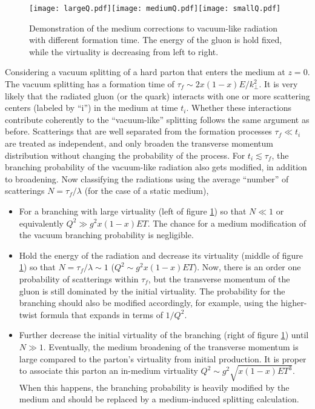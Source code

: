 \begin{figure}
\singlespacing
\texttt{[image: largeQ.pdf]}\texttt{[image: mediumQ.pdf]}\texttt{[image: smallQ.pdf]}
\caption[Demonstration of the medium corrections to vacuum-like radiation]{Demonstration of the medium corrections to vacuum-like radiation with different formation time. The energy of the gluon is hold fixed, while the virtuality is decreasing from left to right.}
\label{fig:vac-med-interface}
\end{figure}

Considering a vacuum splitting of a hard parton that enters the medium at $z=0$.
The vacuum splitting has a formation time of $\tau_f \sim 2x(1-x)E/k_\perp^2$.
It is very likely that the radiated gluon (or the quark) interacts with one or more scattering centers (labeled by ``i'') in the medium at time $t_i$.
Whether these interactions contribute coherently to the ``vacuum-like'' splitting follows the same argument as before.
Scatterings that are well separated from the formation processes $\tau_f \ll t_i$ are treated as independent, and only broaden the transverse momentum distribution without changing the probability of the process.
For $t_i \lesssim \tau_f$, the branching probability of the vacuum-like radiation also gets modified, in addition to broadening.
Now classifying the radiations using the average ``number'' of scatterings  $N = \tau_f/\lambda$ (for the case of a static medium),
\begin{itemize}
\item For a branching with large virtuality (left of figure \ref{fig:vac-med-interface}) so that $N \ll 1$ or equivalently $Q^2 \gg  g^2 x(1-x)E T$. 
The chance for a medium modification of the vacuum branching probability is negligible. 
\item Hold the energy of the radiation and decrease its virtuality (middle of figure \ref{fig:vac-med-interface}) so that $N = \tau_f/\lambda \sim 1$ ($Q^2 \sim g^2 x(1-x)E T$). 
Now, there is an order one probability of scatterings within $\tau_f$, but the transverse momentum of the gluon is still dominated by the initial virtuality.
The probability for the branching should also be modified accordingly, for example, using the higher-twist formula that expands in terms of $1/Q^2$.
\item Further decrease the initial virtuality of the branching (right of figure \ref{fig:vac-med-interface}) until $N \gg 1$.
Eventually, the medium broadening of the transverse momentum is large compared to the parton's virtuality from initial production.
It is proper to associate this parton an in-medium virtuality $Q^2 \sim g^2\sqrt{x(1-x)E T^3}$. 
When this happens, the branching probability is heavily modified by the medium and should be replaced by a medium-induced splitting calculation.
\end{itemize}
